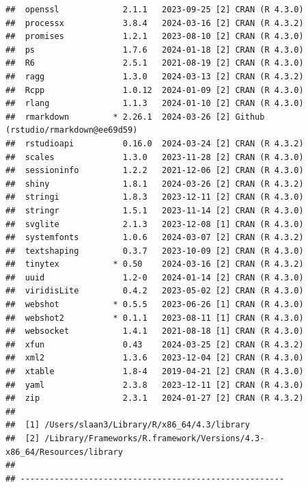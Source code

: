 \documentclass[
]{book}
\begin{document}
\begin{lstlisting}
##  openssl             2.1.1   2023-09-25 [2] CRAN (R 4.3.0)
##  processx            3.8.4   2024-03-16 [2] CRAN (R 4.3.2)
##  promises            1.2.1   2023-08-10 [2] CRAN (R 4.3.0)
##  ps                  1.7.6   2024-01-18 [2] CRAN (R 4.3.0)
##  R6                  2.5.1   2021-08-19 [2] CRAN (R 4.3.0)
##  ragg                1.3.0   2024-03-13 [2] CRAN (R 4.3.2)
##  Rcpp                1.0.12  2024-01-09 [2] CRAN (R 4.3.0)
##  rlang               1.1.3   2024-01-10 [2] CRAN (R 4.3.0)
##  rmarkdown         * 2.26.1  2024-03-26 [2] Github (rstudio/rmarkdown@ee69d59)
##  rstudioapi          0.16.0  2024-03-24 [2] CRAN (R 4.3.2)
##  scales              1.3.0   2023-11-28 [2] CRAN (R 4.3.0)
##  sessioninfo         1.2.2   2021-12-06 [2] CRAN (R 4.3.0)
##  shiny               1.8.1   2024-03-26 [2] CRAN (R 4.3.2)
##  stringi             1.8.3   2023-12-11 [2] CRAN (R 4.3.0)
##  stringr             1.5.1   2023-11-14 [2] CRAN (R 4.3.0)
##  svglite             2.1.3   2023-12-08 [1] CRAN (R 4.3.0)
##  systemfonts         1.0.6   2024-03-07 [2] CRAN (R 4.3.2)
##  textshaping         0.3.7   2023-10-09 [2] CRAN (R 4.3.0)
##  tinytex           * 0.50    2024-03-16 [2] CRAN (R 4.3.2)
##  uuid                1.2-0   2024-01-14 [2] CRAN (R 4.3.0)
##  viridisLite         0.4.2   2023-05-02 [2] CRAN (R 4.3.0)
##  webshot           * 0.5.5   2023-06-26 [1] CRAN (R 4.3.0)
##  webshot2          * 0.1.1   2023-08-11 [1] CRAN (R 4.3.0)
##  websocket           1.4.1   2021-08-18 [1] CRAN (R 4.3.0)
##  xfun                0.43    2024-03-25 [2] CRAN (R 4.3.2)
##  xml2                1.3.6   2023-12-04 [2] CRAN (R 4.3.0)
##  xtable              1.8-4   2019-04-21 [2] CRAN (R 4.3.0)
##  yaml                2.3.8   2023-12-11 [2] CRAN (R 4.3.0)
##  zip                 2.3.1   2024-01-27 [2] CRAN (R 4.3.2)
## 
##  [1] /Users/slaan3/Library/R/x86_64/4.3/library
##  [2] /Library/Frameworks/R.framework/Versions/4.3-x86_64/Resources/library
## 
## ------------------------------------------------------
\end{lstlisting}


  
\end{document}
